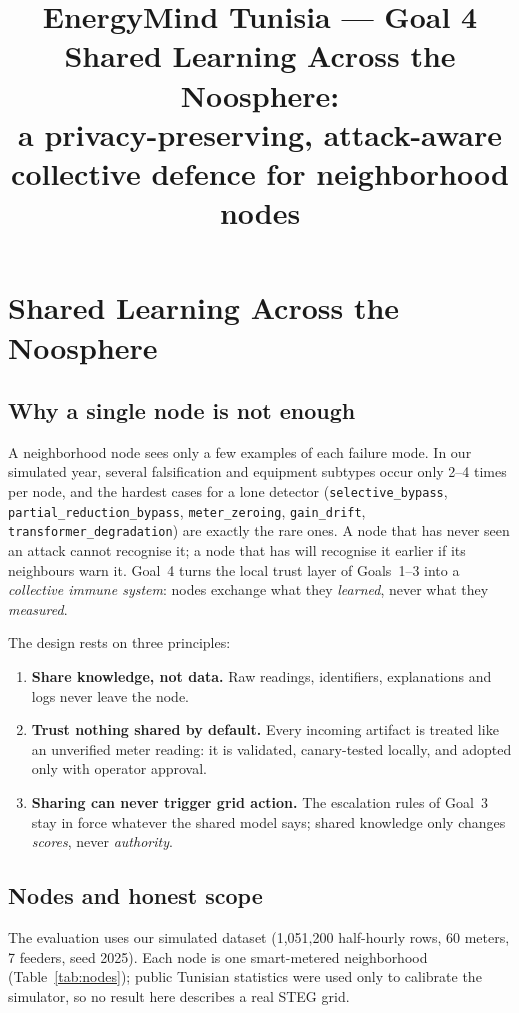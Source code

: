 \documentclass[11pt,a4paper]{article}
\title{\textbf{EnergyMind Tunisia --- Goal 4}\\[2pt]\large Shared Learning Across the Noosphere:\\ a privacy-preserving, attack-aware collective defence for neighborhood nodes}
\author{}\date{}
\newcommand{\code}[1]{\texttt{#1}}
\begin{document}
\maketitle

\section{Shared Learning Across the Noosphere}
\label{sec:goal4}

\subsection{Why a single node is not enough}

A neighborhood node sees only a few examples of each failure mode. In our simulated year, several falsification and equipment subtypes occur only 2--4 times per node, and the hardest cases for a lone detector (\code{selective\_bypass}, \code{partial\_reduction\_bypass}, \code{meter\_zeroing}, \code{gain\_drift}, \code{transformer\_degradation}) are exactly the rare ones. A node that has never seen an attack cannot recognise it; a node that has will recognise it earlier if its neighbours warn it. Goal~4 turns the local trust layer of Goals~1--3 into a \emph{collective immune system}: nodes exchange what they \emph{learned}, never what they \emph{measured}.

The design rests on three principles:
\begin{enumerate}[label=\textbf{P\arabic*.}]
  \item \textbf{Share knowledge, not data.} Raw readings, identifiers, explanations and logs never leave the node.
  \item \textbf{Trust nothing shared by default.} Every incoming artifact is treated like an unverified meter reading: it is validated, canary-tested locally, and adopted only with operator approval.
  \item \textbf{Sharing can never trigger grid action.} The escalation rules of Goal~3 stay in force whatever the shared model says; shared knowledge only changes \emph{scores}, never \emph{authority}.
\end{enumerate}

\subsection{Nodes and honest scope}

The evaluation uses our simulated dataset (1{,}051{,}200 half-hourly rows, 60 meters, 7 feeders, seed 2025). Each node is one smart-metered neighborhood (Table~\ref{tab:nodes}); public Tunisian statistics were used only to calibrate the simulator, so no result here describes a real STEG grid.
\end{document}
